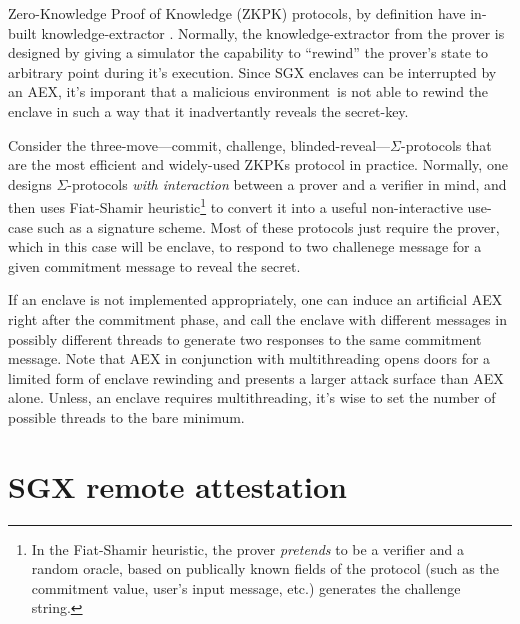 \documentclass[10pt]{article}
\newcommand{\env}{\textsf{environment}}
\begin{document}
  Zero-Knowledge Proof of Knowledge (ZKPK) protocols, by definition
  have in-built knowledge-extractor \cite{BellarePOK, maurerZKP}.
  Normally, the knowledge-extractor from the prover is designed by
  giving a simulator the capability to ``rewind'' the prover's state
  to arbitrary point during it's execution. Since SGX enclaves can be
  interrupted by an AEX, it's imporant that a malicious \env\ is not
  able to rewind the enclave in such a way that it inadvertantly
  reveals the secret-key.

  Consider the three-move---commit, challenge,
  blinded-reveal---$\Sigma$-protocols \cite{sigmaprotocol} that are
  the most efficient and widely-used ZKPKs protocol in practice.
  Normally, one designs $\Sigma$-protocols \textit{with interaction}
  between a prover and a verifier in mind, and then uses Fiat-Shamir
  \cite{FiatShamir} heuristic\footnote{In the Fiat-Shamir heuristic,
    the prover \textit{pretends} to be a verifier and a random oracle,
    based on publically known fields of the protocol (such as the
    commitment value, user's input message, etc.) generates the
    challenge string.} to convert it into a useful non-interactive
  use-case such as a signature scheme. Most of these protocols just
  require the prover, which in this case will be enclave, to respond
  to two challenege message for a given commitment message to reveal
  the secret.

  If an enclave is not implemented appropriately, one can induce an
  artificial AEX right after the commitment phase, and call the
  enclave with different messages in possibly different threads to
  generate two responses to the same commitment message. Note that AEX
  in conjunction with multithreading opens doors for a limited form of
  enclave rewinding and presents a larger attack surface than AEX
  alone.  Unless, an enclave requires multithreading, it's wise to set
  the number of possible threads to the bare minimum.

  \section{SGX remote attestation}
  \label{sec:remoteatt}
\end{document}
